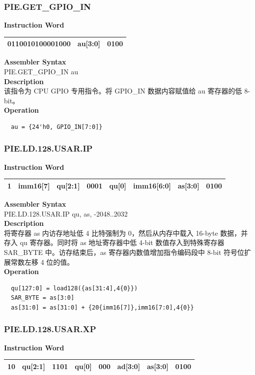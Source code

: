 \newpage
\subsubsection{PIE.GET\_GPIO\_IN}\label{instruction:PIEGETGPIOIN}
\setlength\tabcolsep{6pt}
\textbf{Instruction Word} \\
\begin{tabular}{|c|c|c|}
	\hline
	0110010100001000 & au[3:0] & 0100 \\
	\hline
\end{tabular}

\textbf{Assembler Syntax} \\
PIE.GET\_GPIO\_IN au \\
\textbf{Description} \\
该指令为 CPU GPIO 专用指令。将 GPIO\_IN 数据内容赋值给 au 寄存器的低 8-bit。\\
\textbf{Operation}
\begin{lstlisting}
  au = {24'h0, GPIO_IN[7:0]}
\end{lstlisting}

\newpage
\subsubsection{PIE.LD.128.USAR.IP}\label{instruction:PIELD128USARIP}
\setlength\tabcolsep{6pt}
\textbf{Instruction Word} \\
\begin{tabular}{|c|c|c|c|c|c|c|c|}
	\hline
	1 & imm16[7] & qu[2:1] & 0001 & qu[0] & imm16[6:0] & as[3:0] & 0100 \\
	\hline
\end{tabular}

\textbf{Assembler Syntax} \\
PIE.LD.128.USAR.IP qu, as, -2048..2032 \\
\textbf{Description} \\
将寄存器 as 内访存地址低 4 比特强制为 0，然后从内存中载入 16-byte 数据，并存入 qu 寄存器。同时将 as 地址寄存器中低 4-bit 数值存入到特殊寄存器 SAR\_BYTE 中。访存结束后，as 寄存器内数值增加指令编码段中 8-bit 符号位扩展常数左移 4 位的值。\\
\textbf{Operation}
\begin{lstlisting}
  qu[127:0] = load128({as[31:4],4{0}})
  SAR_BYTE = as[3:0]
  as[31:0] = as[31:0] + {20{imm16[7]},imm16[7:0],4{0}}
\end{lstlisting}

\newpage
\subsubsection{PIE.LD.128.USAR.XP}\label{instruction:PIELD128USARXP}
\setlength\tabcolsep{6pt}
\textbf{Instruction Word} \\
\begin{tabular}{|c|c|c|c|c|c|c|c|}
	\hline
	10 & qu[2:1] & 1101 & qu[0] & 000 & ad[3:0] & as[3:0] & 0100 \\
	\hline
\end{tabular}

